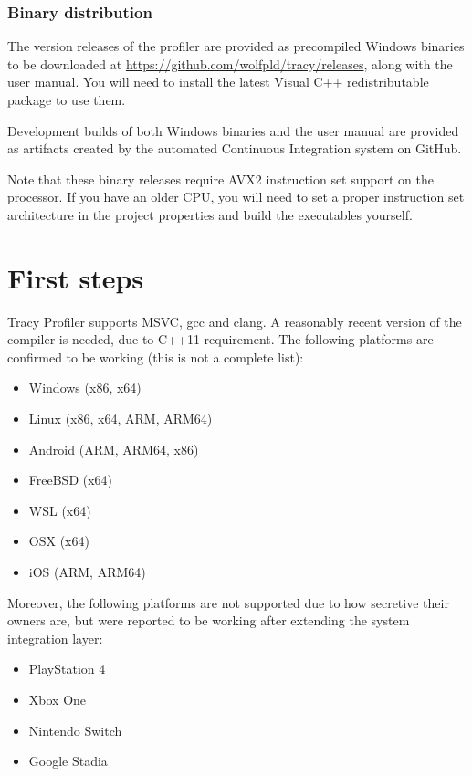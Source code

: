 \documentclass[hidelinks,titlepage,a4paper]{article}
\begin{document}
\subsubsection{Binary distribution}

The version releases of the profiler are provided as precompiled Windows binaries to be downloaded at \url{https://github.com/wolfpld/tracy/releases}, along with the user manual. You will need to install the latest Visual C++ redistributable package to use them.

Development builds of both Windows binaries and the user manual are provided as artifacts created by the automated Continuous Integration system on GitHub.

Note that these binary releases require AVX2 instruction set support on the processor. If you have an older CPU, you will need to set a proper instruction set architecture in the project properties and build the executables yourself.

\section{First steps}
\label{firststeps}

Tracy Profiler supports  MSVC, gcc and clang. A reasonably recent version of the compiler is needed, due to C++11 requirement. The following platforms are confirmed to be working (this is not a complete list):

\begin{itemize}
\item Windows (x86, x64)
\item Linux (x86, x64, ARM, ARM64)
\item Android (ARM, ARM64, x86)
\item FreeBSD (x64)
\item WSL (x64)
\item OSX (x64)
\item iOS (ARM, ARM64)
\end{itemize}

Moreover, the following platforms are not supported due to how secretive their owners are, but were reported to be working after extending the system integration layer:

\begin{itemize}
\item PlayStation 4
\item Xbox One
\item Nintendo Switch
\item Google Stadia
\end{itemize}
\end{document}
